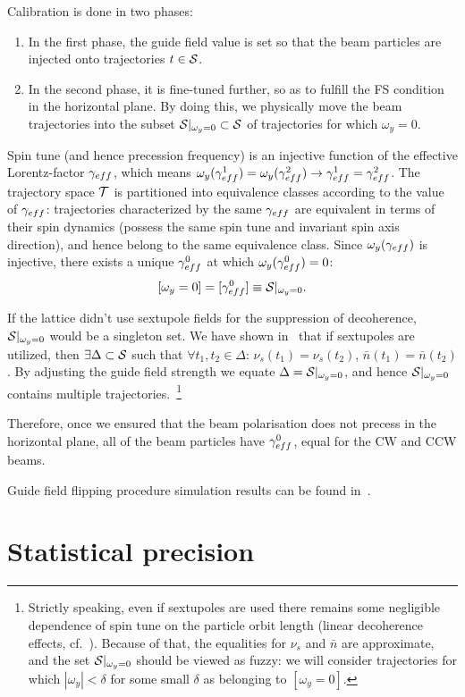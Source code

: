 \documentclass[]{elsarticle}
\newcommand{\w}{\omega}
\newcommand{\nbar}{\bar n}
\newcommand{\D}{\Delta}
\begin{document}
Calibration is done in two phases:
\begin{enumerate}
\item In the first phase, the guide field value is set so that the beam particles are injected onto trajectories
  $t\in\Stab$.
\item In the second phase, it is fine-tuned further, so as to fulfill the FS condition in the horizontal plane.
  By doing this, we physically move the beam trajectories into the subset $\Stab*\subset\Stab$ of trajectories 
  for which $\w_y = 0$.
\end{enumerate}

Spin tune (and hence precession frequency) is an injective function of the
effective Lorentz-factor $\g*$, which means
$\w_y(\g*^1) = \w_y(\g*^2) \rightarrow \g*^1 = \g*^2$. The trajectory space $\mathcal T$ is partitioned into equivalence
classes according to the value of $\g*$: trajectories characterized by the same $\g*$ are equivalent
in terms of their spin dynamics (possess the same spin tune and invariant spin axis direction),
and hence belong to the same equivalence class.
Since $\w_y(\g*)$ is injective, there exists a unique $\g*^0$ at which $\w_y(\g*^0)=0$:
\[
  [\w_y=0] = [\g*^0] \equiv \Stab*.
\]

If the lattice didn't use sextupole fields for the suppression of decoherence,
$\Stab*$ would be a singleton set. We have shown in~\cite{Aksentev:IPAC19:Decoh} that if sextupoles are
utilized, then $\exists\D\subset\Stab$ such that $\forall t_1,t_2\in\D$:
$\nu_s(t_1) = \nu_s(t_2)$, $\nbar(t_1) = \nbar(t_2)$. By adjusting the guide field strength we equate
$\D=\Stab*$, and hence $\Stab*$ contains multiple trajectories.~\footnote{Strictly speaking,
  even if sextupoles are used there remains some negligible dependence of spin tune
  on the particle orbit length (linear decoherence effects, cf.~\cite{Aksentev:IPAC19:Decoh}).
  Because of that, the equalities for $\nu_s$ and $\nbar$ are approximate, and the set $\Stab*$
  should be viewed as fuzzy:
  we will consider trajectories for which $|\w_y|<\delta$ for some small $\delta$ as belonging to $[\w_y=0]$.}

Therefore, once we ensured that the beam polarisation does not precess in the horizontal plane,
all of the beam particles have $\g*^0$, equal for the CW and CCW beams.

Guide field flipping procedure simulation results can be found in~\cite{Aksentev:IPAC19:GFF}.


\section{Statistical precision}
\end{document}
